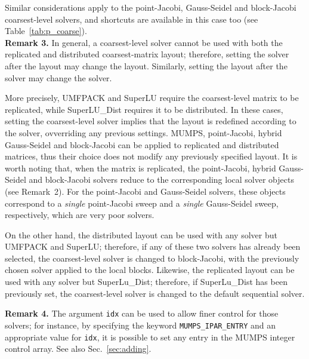 Similar considerations apply to the point-Jacobi, Gauss-Seidel and block-Jacobi
coarsest-level solvers, and shortcuts are available
in this case too (see Table~\ref{tab:p_coarse}). \\

\textbf{Remark 3.} In general, a coarsest-level solver cannot be used with
both the replicated and distributed coarsest-matrix layout;
therefore, setting the solver after the layout may change the layout.
Similarly, setting the layout after the solver may change the solver.

More precisely, UMFPACK and SuperLU require the coarsest-level
matrix to be replicated, while SuperLU\_Dist requires it to be distributed.
In these cases, setting the coarsest-level solver implies that
the layout is redefined according to the solver, ovverriding any
previous settings. MUMPS,  point-Jacobi,
hybrid Gauss-Seidel and block-Jacobi can be applied to
replicated and distributed matrices, thus their choice
does not modify any previously specified layout.
It is worth noting that, when the matrix is replicated,
the point-Jacobi, hybrid Gauss-Seidel and block-Jacobi solvers
reduce to the corresponding local solver objects (see Remark~2).
For the point-Jacobi and Gauss-Seidel solvers, these objects
correspond to a \emph{single} point-Jacobi sweep and a \emph{single} 
Gauss-Seidel sweep, respectively, which are very poor solvers.

On the other hand, the distributed layout can be used with any solver
but UMFPACK and SuperLU; therefore, if any of these two solvers has already
been selected, the coarsest-level solver is changed to block-Jacobi,
with the previously chosen solver applied to the local blocks.
Likewise, the replicated layout can be used with any solver but SuperLu\_Dist;
therefore, if SuperLu\_Dist has been previously set, the coarsest-level
solver is changed to the default sequential solver.

\textbf{Remark 4.}  The argument \verb|idx| can be used to allow finer
control for those solvers; for instance, by specifying the keyword
\verb|MUMPS_IPAR_ENTRY| and an appropriate value for \verb|idx|, it is
possible to set any entry in the MUMPS integer control array.
See also Sec.~\ref{sec:adding}. 


